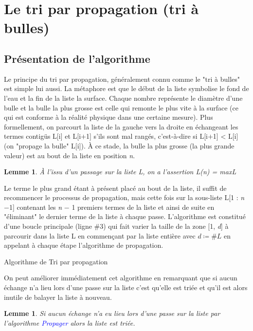 \documentclass[a4paper,10pt]{article}
\newtheorem{lemme}[theoreme]{Lemme}
\begin{document}
\section{Le tri par propagation (tri à bulles)}
\subsection{Présentation de l'algorithme}
Le principe du tri par propagation, généralement connu comme le "tri à bulles" est simple lui aussi. 
La mé­ta­pho­re est que le début de la liste symbolise le fond de l'eau et la fin de la liste la surface. 
Chaque nom­bre représente le diamètre d'une bulle et la bulle la plus grosse est celle qui remonte le plus vite 
à la surface (ce qui est conforme à la réalité physique dans une certaine mesure). Plus formellement, 
on parcourt la liste de la gauche vers la droite en échan­geant les termes contigüs L[i] et L[i$+$1] s'ils sont mal rangés, 
c'est-à-dire si L[i$+$1] < L[i] (on "propage la bulle" L[i]). À ce stade, la bulle la plus grosse 
(la plus grande valeur) est au bout de la liste en position {\itshape n}. 

\begin{lemme}
    À l'issu d'un passage sur la liste L, on a l'assertion L(n) = maxL
\end{lemme}

Le terme le plus grand étant à présent placé au bout de la liste, il suffit de recommencer 
le processus de propagation, mais cette fois sur la sous-liste L[1 : {\itshape n}$-$1] con­te­nant les {\itshape n} $-$ 1 
premiers termes de la liste et ainsi de suite en "éliminant" le dernier terme de la liste à chaque passe. 
L'algorithme est constitué d'une boucle principale (ligne \#3) qui fait varier la taille de la zone [1, {\itshape d}]
à parcourir dans la liste L en commençant par la liste entière avec $d \coloneqq \#L$
en appelant à chaque étape l'algorithme de propagation.
\label{algotriabulle}
\begin{center}
    Algorithme de Tri par propagation
\end{center}

On peut améliorer immédiatement cet algorithme en remarquant que si aucun échange n'a lieu 
lors d'une passe sur la liste c'est qu'elle est triée et qu'il est alors inutile de balayer la liste à nouveau.

\begin{lemme}
    Si aucun échange n'a eu lieu lors d'une passe sur la liste par l'algorithme \textcolor{blue}{Propager} 
    alors la liste est triée.
\end{lemme}
\end{document}
